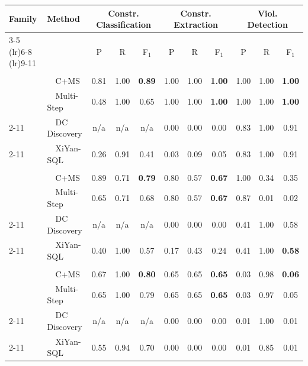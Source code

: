 \begin{tabular}{llccccccccc}
\toprule
\textbf{Family} & \textbf{Method} & \multicolumn{3}{c}{Constr. Classification} & \multicolumn{3}{c}{Constr. Extraction} & \multicolumn{3}{c}{Viol. Detection} \\
\cmidrule(lr){3-5}  \cmidrule(lr){6-8}  \cmidrule(lr){9-11}
 &  & P & R & F$_1$ & P & R & F$_1$ & P & R & F$_1$ \\
\midrule
\addlinespace[2pt]
\multicolumn{11}{c}{\textbf{Hospital}} \\
\addlinespace[1pt]
\multirow{2}{*}{\system} & ~~C+MS & 0.81 & 1.00 & \textbf{0.89} & 1.00 & 1.00 & \textbf{1.00} & 1.00 & 1.00 & \textbf{1.00} \\
 & ~~Multi-Step & 0.48 & 1.00 & 0.65 & 1.00 & 1.00 & \textbf{1.00} & 1.00 & 1.00 & \textbf{1.00} \\
\cmidrule(l){2-11}
\multirow{1}{*}{Profiling} & ~~DC Discovery & n/a & n/a & n/a & 0.00 & 0.00 & 0.00 & 0.83 & 1.00 & 0.91 \\
\cmidrule(l){2-11}
\multirow{1}{*}{Text2SQL} & ~~XiYan-SQL & 0.26 & 0.91 & 0.41 & 0.03 & 0.09 & 0.05 & 0.83 & 1.00 & 0.91 \\
\midrule
\addlinespace[2pt]
\multicolumn{11}{c}{\textbf{Restaurant}} \\
\addlinespace[1pt]
\multirow{2}{*}{\system} & ~~C+MS & 0.89 & 0.71 & \textbf{0.79} & 0.80 & 0.57 & \textbf{0.67} & 1.00 & 0.34 & 0.35 \\
 & ~~Multi-Step & 0.65 & 0.71 & 0.68 & 0.80 & 0.57 & \textbf{0.67} & 0.87 & 0.01 & 0.02 \\
\cmidrule(l){2-11}
\multirow{1}{*}{Profiling} & ~~DC Discovery & n/a & n/a & n/a & 0.00 & 0.00 & 0.00 & 0.41 & 1.00 & 0.58 \\
\cmidrule(l){2-11}
\multirow{1}{*}{Text2SQL} & ~~XiYan-SQL & 0.40 & 1.00 & 0.57 & 0.17 & 0.43 & 0.24 & 0.41 & 1.00 & \textbf{0.58} \\
\midrule
\addlinespace[2pt]
\multicolumn{11}{c}{\textbf{SISU}} \\
\addlinespace[1pt]
\multirow{2}{*}{\system} & ~~C+MS & 0.67 & 1.00 & \textbf{0.80} & 0.65 & 0.65 & \textbf{0.65} & 0.03 & 0.98 & \textbf{0.06} \\
 & ~~Multi-Step & 0.65 & 1.00 & 0.79 & 0.65 & 0.65 & \textbf{0.65} & 0.03 & 0.97 & 0.05 \\
\cmidrule(l){2-11}
\multirow{1}{*}{Profiling} & ~~DC Discovery & n/a & n/a & n/a & 0.00 & 0.00 & 0.00 & 0.01 & 1.00 & 0.01 \\
\cmidrule(l){2-11}
\multirow{1}{*}{Text2SQL} & ~~XiYan-SQL & 0.55 & 0.94 & 0.70 & 0.00 & 0.00 & 0.00 & 0.01 & 0.85 & 0.01 \\

\end{tabular}
